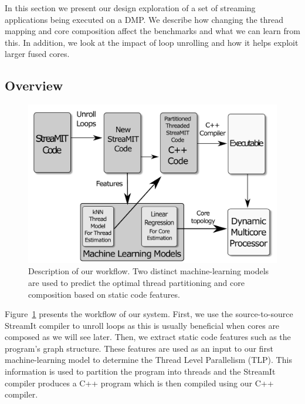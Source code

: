 In this section we present our design exploration of a set of streaming applications being executed on a DMP.
We describe how changing the thread mapping and core composition affect the benchmarks and what we can learn from this.
In addition, we look at the impact of loop unrolling and how it helps exploit larger fused cores.

\subsection{Overview}

\begin{figure}[t]
    \centering
    \includegraphics[width=1\textwidth]{streamit-paper/graphics/explanation.pdf}
    \caption{Description of our workflow.
    Two distinct machine-learning models are used to predict the optimal thread partitioning and core composition based on static code features.}
    \label{fig:overview}
\end{figure}

Figure~\ref{fig:overview} presents the workflow of our system.
First, we use the source-to-source StreamIt compiler to unroll loops as this is usually beneficial when cores are composed as we will see later.
Then, we extract static code features such as the program's graph structure.
These features are used as an input to our first machine-learning model to determine the Thread Level Parallelism (TLP).
This information is used to partition the program into threads and the StreamIt compiler produces a C++ program which  is then compiled using our C++ compiler.

